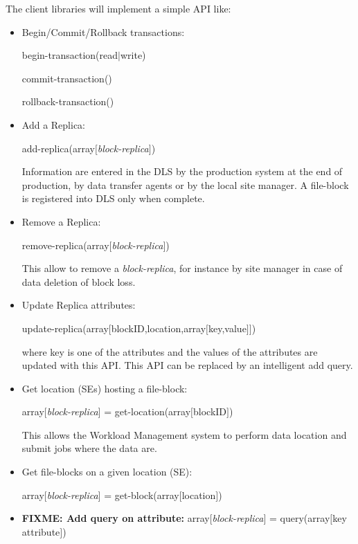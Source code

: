 \documentclass[pdftex]{cmspaper}
\begin{document}
The client libraries will implement a simple API like:
\begin{itemize}
\item Begin/Commit/Rollback transactions:

       begin-transaction(read$|$write)

       commit-transaction()

       rollback-transaction()

\item Add a Replica:  

    add-replica(array$[${\em block-replica}$]$)
    
     Information are entered in the DLS by the production system at 
     the end of production, by data transfer agents or by the local 
     site manager. A file-block is registered into DLS only when complete.

\item Remove a Replica:
  
      remove-replica(array$[${\em block-replica}$]$)

      This allow to remove a {\em block-replica}, for instance by site 
      manager in case of data deletion of block loss.

\item Update Replica attributes:

      update-replica(array$[$blockID,location,array$[$key,value$]$$]$)

      where key is one of the attributes and the values of the attributes are updated
      with this API. This API can be replaced by an intelligent add query.

\item Get location (SEs) hosting a file-block:  

       array$[${\em block-replica}$]$ = get-location(array$[$blockID$]$)

      This allows the Workload Management system to perform data location
      and submit jobs where the data are.

\item Get file-blocks on a given location (SE):

       array$[${\em block-replica}$]$ = get-block(array$[$location$]$)

\item {\bf FIXME: Add query on attribute:}  array$[${\em block-replica}$]$ = query(array$[$key attribute$]$)
 

\end{itemize}
\end{document}
